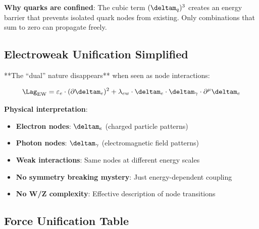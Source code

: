 	\textbf{Why quarks are confined}:
	The cubic term $(\deltam_q)^3$ creates an energy barrier that prevents isolated quark nodes from existing. Only combinations that sum to zero can propagate freely.
	
	\subsection{Electroweak Unification Simplified}
	
	**The ``dual'' nature disappears** when seen as node interactions:
	
	\begin{equation}
		\Lag_{\text{EW}} = \varepsilon_e \cdot (\partial \deltam_e)^2 + \lambda_{ew} \cdot \deltam_e \cdot \deltam_\gamma \cdot \partial^\mu \deltam_e
	\end{equation}
	
	\textbf{Physical interpretation}:
	\begin{itemize}
		\item \textbf{Electron nodes}: $\deltam_e$ (charged particle patterns)
		\item \textbf{Photon nodes}: $\deltam_\gamma$ (electromagnetic field patterns)
		\item \textbf{Weak interactions}: Same nodes at different energy scales
		\item \textbf{No symmetry breaking mystery}: Just energy-dependent coupling
		\item \textbf{No W/Z complexity}: Effective description of node transitions
	\end{itemize}
	
	\subsection{Force Unification Table}
	
